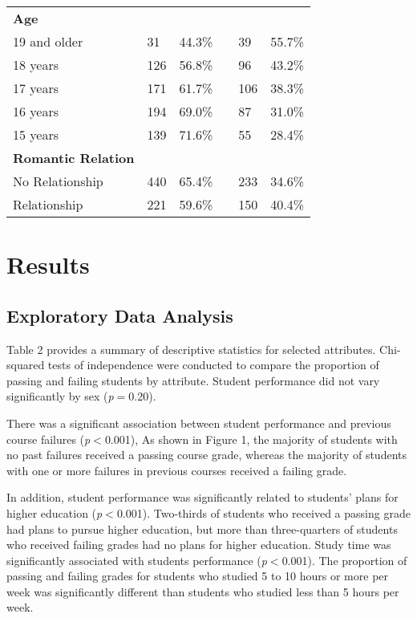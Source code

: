 \documentclass[sigconf]{acmart}
\begin{document}
\begin{table}
\begin{tabular}{llllll}
    \midrule
    \textbf{Age}    &     &         & &     & \\
    19 and older    &  31 & 44.3\% & &  39 & 55.7\% \\
    18 years        & 126 & 56.8\% & &  96 & 43.2\% \\
    17 years        & 171 & 61.7\% & & 106 & 38.3\% \\
    16 years        & 194 & 69.0\% & &  87 & 31.0\% \\
    15 years        & 139 & 71.6\% & &  55 & 28.4\% \\
    \textbf{Romantic Relation} & &  &  &  & \\
    No Relationship & 440 & 65.4\% & & 233 & 34.6\%  \\
    Relationship    & 221 & 59.6\% & & 150 & 40.4\%  \\    
    \bottomrule
  \end{tabular}
\end{table}

 
 
 
 
 
 
\section{Results}

\subsection{Exploratory Data Analysis}

Table 2 provides a summary of descriptive statistics for selected attributes. 
Chi-squared tests of independence were conducted to compare the proportion of 
passing and failing students by attribute. Student performance did not 
vary significantly by sex (\textit{p}$=$0.20). 

There was a significant association between student performance and previous 
course failures (\textit{p}$<$0.001), As shown in Figure 1, the majority of 
students with no past failures received a passing course grade, whereas the 
majority of students with one or more failures in previous courses received 
a failing grade. 


In addition, student performance was significantly 
related to students' plans for higher education (\textit{p}$<$0.001). Two-thirds 
of students who received a passing grade had plans to pursue higher education, 
but more than three-quarters of students who received failing grades had no 
plans for higher education. Study time was significantly associated with 
students performance (\textit{p}$<$0.001). The proportion of passing and failing
grades for students who studied 5 to 10 hours or more per week was 
significantly different than students who studied less than 5 hours per week. 
\end{document}

